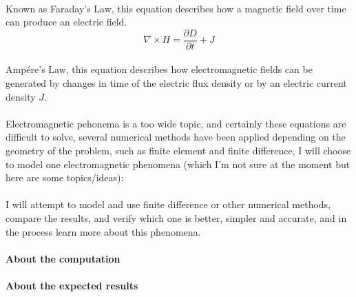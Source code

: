 \documentclass{article}
\begin{document}
\paragraph{}Known as Faraday's Law, this equation describes how a magnetic field over time can produce an electric field.
\begin{equation}
	\nabla \times H = \frac{\partial D}{\partial t} + J
\end{equation}
\paragraph{} Ampére's Law, this equation describes how electromagnetic fields can be generated by changes in time of the electric flux density or by an electric current density $J$.
\paragraph{} Electromagnetic pehonema is a too wide topic, and certainly these equations are difficult to solve, several numerical methods have been applied depending on the geometry of the problem, such as finite element and finite difference, I will choose to model one electromagnetic phenomena (which I'm not sure at the moment but here are some topics/ideas):

\paragraph{} I will attempt to model and use finite difference\cite{monk_finite_2003} or other numerical methods\cite{mismar_numerical_2017}, compare the results, and verify which one is better, simpler and accurate, and in the process learn more about this phenomena.

\paragraph{About the computation}

\paragraph{About the expected results}



\end{document}

